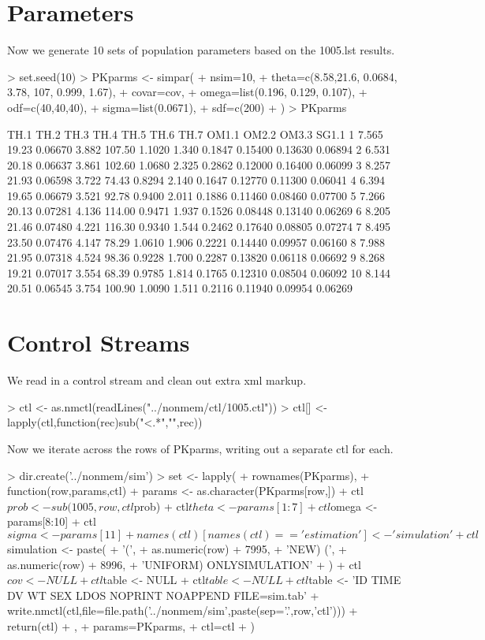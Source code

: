 \section{Parameters}
Now we generate 10 sets of population parameters based on the 1005.lst results.
\begin{Schunk}
\begin{Sinput}
> set.seed(10)
> PKparms <- simpar(
+     nsim=10,
+     theta=c(8.58,21.6, 0.0684, 3.78, 107, 0.999, 1.67),
+     covar=cov,
+     omega=list(0.196, 0.129, 0.107),
+     odf=c(40,40,40),
+     sigma=list(0.0671),
+     sdf=c(200)
+ )
> PKparms
\end{Sinput}
\begin{Soutput}
    TH.1  TH.2    TH.3  TH.4   TH.5   TH.6  TH.7  OM1.1   OM2.2   OM3.3   SG1.1
1  7.565 19.23 0.06670 3.882 107.50 1.1020 1.340 0.1847 0.15400 0.13630 0.06894
2  6.531 20.18 0.06637 3.861 102.60 1.0680 2.325 0.2862 0.12000 0.16400 0.06099
3  8.257 21.93 0.06598 3.722  74.43 0.8294 2.140 0.1647 0.12770 0.11300 0.06041
4  6.394 19.65 0.06679 3.521  92.78 0.9400 2.011 0.1886 0.11460 0.08460 0.07700
5  7.266 20.13 0.07281 4.136 114.00 0.9471 1.937 0.1526 0.08448 0.13140 0.06269
6  8.205 21.46 0.07480 4.221 116.30 0.9340 1.544 0.2462 0.17640 0.08805 0.07274
7  8.495 23.50 0.07476 4.147  78.29 1.0610 1.906 0.2221 0.14440 0.09957 0.06160
8  7.988 21.95 0.07318 4.524  98.36 0.9228 1.700 0.2287 0.13820 0.06118 0.06692
9  8.268 19.21 0.07017 3.554  68.39 0.9785 1.814 0.1765 0.12310 0.08504 0.06092
10 8.144 20.51 0.06545 3.754 100.90 1.0090 1.511 0.2116 0.11940 0.09954 0.06269
\end{Soutput}
\end{Schunk}
\section{Control Streams}
We read in a control stream and clean out extra xml markup.
\begin{Schunk}
\begin{Sinput}
> ctl <- as.nmctl(readLines("../nonmem/ctl/1005.ctl"))
> ctl[] <- lapply(ctl,function(rec)sub("<.*","",rec))
\end{Sinput}
\end{Schunk}
Now we iterate across the rows of PKparms, writing out a separate ctl for each.
\begin{Schunk}
\begin{Sinput}
> dir.create('../nonmem/sim')
> set <- lapply(
+ 	rownames(PKparms),
+ 	function(row,params,ctl){
+ 		params <- as.character(PKparms[row,])
+ 		ctl$prob <- sub(1005,row,ctl$prob)
+ 		ctl$theta <- params[1:7]
+ 		ctl$omega <- params[8:10]
+ 		ctl$sigma <- params[11]
+ 		names(ctl)[names(ctl)=='estimation'] <- 'simulation'
+ 		ctl$simulation <- paste(
+ 			'(',
+ 			as.numeric(row) + 7995,
+ 			'NEW) (',
+ 			as.numeric(row) + 8996,
+ 			'UNIFORM) ONLYSIMULATION'
+ 		)
+ 		ctl$cov <- NULL
+ 		ctl$table <- NULL
+ 		ctl$table <- NULL
+ 		ctl$table <- 'ID TIME DV WT SEX LDOS NOPRINT NOAPPEND FILE=sim.tab'
+ 		write.nmctl(ctl,file=file.path('../nonmem/sim',paste(sep='.',row,'ctl')))
+ 		return(ctl)		
+ 	},
+ 	params=PKparms,
+ 	ctl=ctl
+ )
\end{Sinput}
\end{Schunk}
